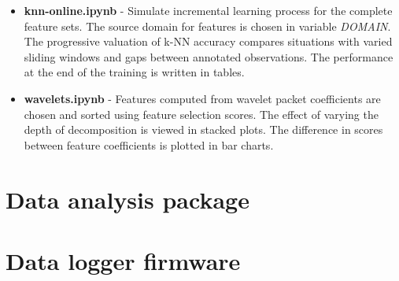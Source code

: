 \begin{itemize}[noitemsep]
\item \textbf{knn-online.ipynb} - Simulate incremental learning process for the complete feature sets. The source domain for features is chosen in variable \emph{DOMAIN}. The progressive valuation of k-NN accuracy compares situations with varied sliding windows and gaps between annotated observations. The performance at the end of the training is written in tables.

\item \textbf{wavelets.ipynb} - Features computed from wavelet packet coefficients are chosen and sorted using feature selection scores. The effect of varying the depth of decomposition is viewed in stacked plots. The difference in scores between feature coefficients is plotted in bar charts.
\end{itemize}

\section{Data analysis package}


\section{Data logger firmware}

